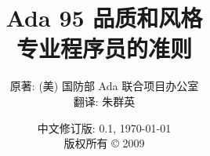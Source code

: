 \documentclass[11pt]{book}
\begin{document}
\title{{\textbf{\Huge{Ada 95 品质和风格}}}\\
\huge{专业程序员的准则}}
\author{
原著: (美) 国防部 Ada 联合项目办公室\\
翻译: 朱群英
}
\date{
中文修订版: 0.1, \today\\
\vfill
版权所有 \copyright{} 2009
}

\frontmatter
\pagestyle{empty}
\maketitle

\setcounter{secnumdepth}{-1} %




\setcounter{secnumdepth}{2} %
\cleardoublepage

\pagestyle{fancy}
\tableofcontents

\mainmatter




\end{document}
